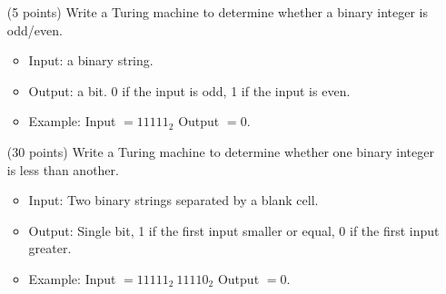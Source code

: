 \documentclass[11pt]{report}
\begin{document}
\begin{enumerate}
		\item[(5 points)] Write a Turing machine to determine whether a binary integer is odd/even.

			\begin{itemize}
				\item Input: a binary string.
				\item Output: a bit. 0 if the input is odd, 1 if the input is even.
				\item Example: Input $= 11111_{2}$ Output $= 0$.
			\end{itemize}
		
		\item[(30 points)] Write a Turing machine to determine whether one binary integer is less than another.

			\begin{itemize}
				\item Input: Two binary strings separated by a blank cell.
				\item Output: Single bit, 1 if the first input smaller or equal, 0 if the first input greater.
				\item Example: Input $= 11111_{2} \ 11110_{2}$ Output $= 0$.
			\end{itemize}


	\end{enumerate}
\end{document}
